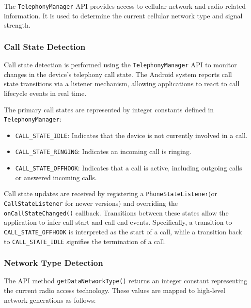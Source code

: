 \documentclass{article}
\theoremstyle{plain}
\theoremstyle{definition}
\theoremstyle{remark}
\begin{document}
The \texttt{TelephonyManager} API provides access to cellular network and radio-related information. It is used to determine the current cellular network type and signal strength.

\subsubsection{Call State Detection}

Call state detection is performed using the \texttt{TelephonyManager} API to monitor changes in the device's telephony call state. The Android system reports call state transitions via a listener mechanism, allowing applications to react to call lifecycle events in real time.

The primary call states are represented by integer constants defined in \texttt{TelephonyManager}:
\begin{itemize}
    \item \texttt{CALL\_STATE\_IDLE}: Indicates that the device is not currently involved in a call.
    \item \texttt{CALL\_STATE\_RINGING}: Indicates an incoming call is ringing.
    \item \texttt{CALL\_STATE\_OFFHOOK}: Indicates that a call is active, including outgoing calls or answered incoming calls.
\end{itemize}

Call state updates are received by registering a \texttt{PhoneStateListener}(or \texttt{CallStateListener} for newer versions) and overriding the \texttt{onCallStateChanged()} callback. Transitions between these states allow the application to infer call start and call end events. Specifically, a transition to \texttt{CALL\_STATE\_OFFHOOK} is interpreted as the start of a call, while a transition back to \texttt{CALL\_STATE\_IDLE} signifies the termination of a call.




\subsubsection{Network Type Detection}

The API method \texttt{getDataNetworkType()} returns an integer constant representing the current radio access technology. These values are mapped to high-level network generations as follows:
\end{document}
